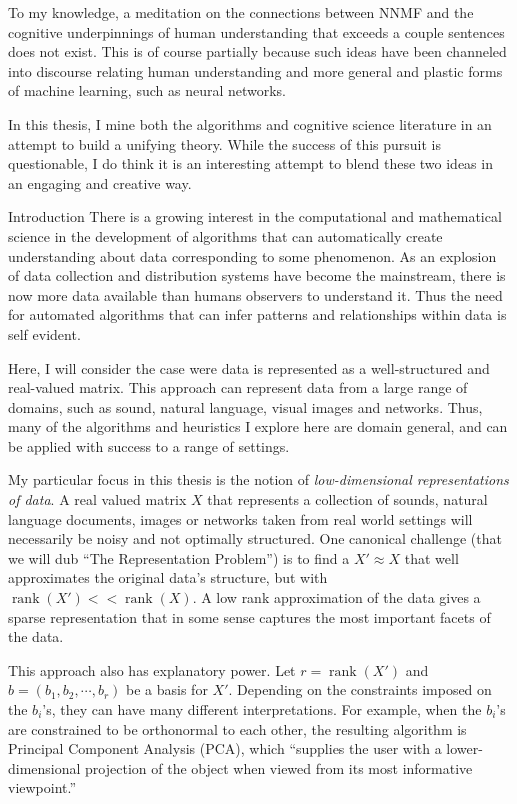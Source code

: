 \documentclass[12pt]{pom_thesis}
\begin{document}
To my knowledge, a meditation on the connections between NNMF and the cognitive underpinnings of human understanding that exceeds a couple sentences does not exist. This is of course partially because such ideas have been channeled into discourse relating human understanding and more general and plastic forms of machine learning, such as neural networks. 

In this thesis, I mine both the algorithms and cognitive science literature in an attempt to build a unifying theory. While the success of this pursuit is questionable, I do think it is an interesting attempt to blend these two ideas in an engaging and creative way.
\begin{chapter}{Introduction}
	There is a growing interest in the computational and mathematical science in the development of algorithms that can automatically create understanding about data corresponding to some phenomenon. As an explosion of data collection and distribution systems have become the mainstream, there is now more data available than humans observers to understand it. Thus the need for automated algorithms that can infer patterns and relationships within data is self evident. 
	
	Here, I will consider the case were data is represented as a well-structured and  real-valued matrix. This approach can represent data from a large range of domains, such as sound, natural language, visual images and networks. Thus, many of the algorithms and heuristics I explore here are domain general, and can be applied with success to a range of settings. 
	
	My particular focus in this thesis is the notion of \textit{low-dimensional representations of data}. A real valued matrix $X$ that represents a collection of sounds, natural language documents, images or networks taken from real world settings will necessarily be noisy and not optimally structured. One canonical challenge (that we will dub ``The Representation Problem'') is to find a $X' \approx X$ that well approximates the original data's structure, but with $\operatorname{rank}(X') << \operatorname{rank}(X)$. A low rank approximation of the data gives a sparse representation that in some sense captures the most important facets of the data. 
	
	This approach also has explanatory power. Let $r = \operatorname{rank}(X')$ and $b= (b_1,b_2,\cdots,b_r)$ be a basis for $X'$. Depending on the constraints imposed on the $b_i$'s, they can have many different interpretations. For example, when the $b_i$'s are constrained to be orthonormal to each other, the resulting algorithm is Principal Component Analysis (PCA), which ``supplies the user with a lower-dimensional projection of the object when viewed from its most informative viewpoint.'' 
	

\end{chapter}
\end{document}
